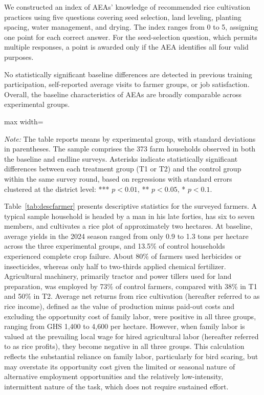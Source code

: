 \documentclass[11pt]{article}
\newcommand{\fittable}[1]{%
  \begin{adjustbox}{max width=\linewidth}\scriptsize\end{adjustbox}}
\newcommand{\tnote}[1]{%
  \par\vspace{3pt}%
  \noindent\begin{minipage}{\linewidth}%
    \scriptsize\setlength{\parindent}{0pt}\textit{Note:} #1%
  \end{minipage}}
\begin{document}
We constructed an index of AEAs' knowledge of recommended rice cultivation practices using five questions covering seed selection, land leveling, planting spacing, water management, and drying. The index ranges from 0 to 5, assigning one point for each correct answer. For the seed-selection question, which permits multiple responses, a point is awarded only if the AEA identifies all four valid purposes.

No statistically significant baseline differences are detected in previous training participation, self-reported average visits to farmer groups, or job satisfaction. Overall, the baseline characteristics of AEAs are broadly comparable across experimental groups.


\begin{table}
\centering
\caption{Descriptive statistics: farm households}
\label{tab:descfarmer}
\fittable{tmp/desc_ms_farmer}
\tnote{
The table reports means by experimental group, with standard
deviations in parentheses. The sample comprises the 373 farm
households observed in both the baseline and endline surveys.
Asterisks indicate statistically significant differences
between each treatment group (T1 or T2) and the control group
within the same survey round, based on regressions with
standard errors clustered at the district level:
*** $p<0.01$, ** $p<0.05$, * $p<0.1$.
}
\end{table}


Table~\ref{tab:descfarmer} presents descriptive statistics for the surveyed farmers. A typical sample household is headed by a man in his late forties, has six to seven members, and cultivates a rice plot of approximately two hectares. At baseline, average yields in the 2024 season ranged from only 0.9 to 1.3 tons per hectare across the three experimental groups, and 13.5\% of control households experienced complete crop failure. About 80\% of farmers used herbicides or insecticides, whereas only half to two-thirds applied chemical fertilizer. Agricultural machinery, primarily tractor and power tillers used for land preparation, was employed by 73\% of control farmers, compared with 38\% in T1 and 50\% in T2. Average net returns from rice cultivation (hereafter referred to as rice income), defined as the value of production minus paid-out costs and excluding the opportunity cost of family labor, were positive in all three groups, ranging from GHS 1,400 to 4,600 per hectare. However, when family labor is valued at the prevailing local wage for hired agricultural labor (hereafter referred to as rice profits), they become negative in all three groups. This calculation reflects the substantial reliance on family labor, particularly for bird scaring, but may overstate its opportunity cost given the limited or seasonal nature of alternative employment opportunities and the relatively low-intensity, intermittent nature of the task, which does not require sustained effort. 
\end{document}
